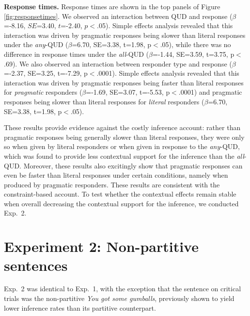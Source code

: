 \documentclass[10pt,letterpaper]{article}
\newcommand{\figref}[1]{Figure \ref{#1}}
\begin{document}
  
\noindent \textbf{Response times.} Response times are shown in the top panels of \figref{fig:responsetimes}. We observed an interaction between QUD and response ($\beta$=-8.16, $SE$=3.40, $t$=-2.40, $p$$<$.05). Simple effects analysis revealed that this interaction was driven by pragmatic responses being slower than literal responses under the \textit{any}-QUD ($\beta$=6.70, SE=3.38, t=1.98, p$<$.05), while there was no difference in response times under the \textit{all}-QUD ($\beta$=-1.44, SE=3.59, t=3.75, p$<$.69). We also observed an interaction between responder type and response ($\beta$=-2.37, SE=3.25, t=-7.29, p$<$.0001). 
Simple effects analysis revealed that this interaction was driven by pragmatic responses being faster than literal responses for \emph{pragmatic}  responders ($\beta$=-1.69, SE=3.07, t=-5.53, p$<$.0001) and pragmatic responses being slower than literal responses for \emph{literal} responders ($\beta$=6.70, SE=3.38, t=1.98, p$<$.05). 

These results provide evidence against the costly inference account: rather than pragmatic responses being generally slower than literal responses, they were only so when given by literal responders or when given in response to the \emph{any}-QUD, which was found to provide less contextual support for the inference than the \emph{all}-QUD. Moreover, these results also excitingly show that pragmatic responses can even be faster than literal responses under certain conditions, namely when produced by pragmatic responders. These results are consistent with the constraint-based account. To test whether the contextual effects remain stable when overall decreasing the contextual support for the inference, we conducted Exp.~2.


\section{Experiment 2: Non-partitive sentences}

Exp.~2 was identical to Exp.~1, with the exception that the sentence on critical trials was the non-partitive \emph{You got some gumballs}, previously shown to yield lower inference rates than its partitive counterpart. %
\end{document}
